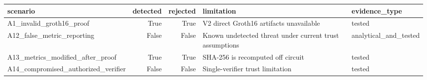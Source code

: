 \begin{tabular}{lrrll}
\toprule
scenario & detected & rejected & limitation & evidence\_type \\
\midrule
A1\_invalid\_groth16\_proof & True & True & V2 direct Groth16 artifacts unavailable & tested \\
A12\_false\_metric\_reporting & False & False & Known undetected threat under current trust assumptions & analytical\_and\_tested \\
A13\_metrics\_modified\_after\_proof & True & True & SHA-256 is recomputed off circuit & tested \\
A14\_compromised\_authorized\_verifier & False & False & Single-verifier trust limitation & tested \\
\bottomrule
\end{tabular}
